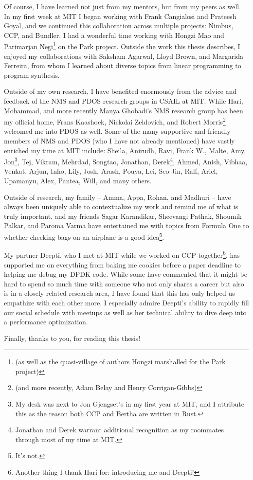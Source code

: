 Of course, I have learned not just from my mentors, but from my peers as well. In my first week at MIT I began working with Frank Cangialosi and Prateesh Goyal, and we continued this collaboration across multiple projects: Nimbus, CCP, and Bundler. I had a wonderful time working with Hongzi Mao and Parimarjan Negi\footnote{(as well as the quasi-village of authors Hongzi marshalled for the Park project)} on the Park project. 
Outside the work this thesis describes, I enjoyed my collaborations with Saksham Agarwal, Lloyd Brown, and Margarida Ferreira, from whom I learned about diverse topics from linear programming to program synthesis.

Outside of my own research, I have benefited enormously from the advice and feedback of the NMS and PDOS research groups in CSAIL at MIT. While Hari, Mohammad, and more recently Manya Ghobadi's NMS research group has been my official home, Frans Kaashoek, Nickolai Zeldovich, and Robert Morris\footnote{(and more recently, Adam Belay and Henry Corrigan-Gibbs)} welcomed me into PDOS as well. Some of the many supportive and friendly members of NMS and PDOS (who I have not already mentioned) have
vastly enriched my time at MIT include:
Sheila, Anirudh, Ravi, Frank W., Malte, Amy, Jon\footnote{My desk was next to Jon Gjengset's in my first year at MIT, and I attribute this as the reason both CCP and Bertha are written in Rust.}, Tej, Vikram, Mehrdad, Songtao, Jonathan, Derek\footnote{Jonathan and Derek warrant additional recognition as my roommates through most of my time at MIT.}, Ahmed, Anish, Vibhaa, Venkat, Arjun, Inho, Lily, Josh, Arash, Pouya, Lei, Seo Jin, Ralf, Ariel, Upamanyu, Alex, Pantea, Will, and many others.

Outside of research, my family -- Amma, Appa, Rohan, and Madhuri -- have always been uniquely able to contextualize my work and remind me of what is truly important, and my friends Sagar Karandikar, Sheevangi Pathak, Shoumik Palkar, and Paroma Varma have entertained me with topics from Formula One to whether checking bags on an airplane is a good idea\footnote{It's not.}.

My partner Deepti, who I met at MIT while we worked on CCP together\footnote{Another thing I thank Hari for: introducing me and Deepti!}, has supported me on everything from baking me cookies before a paper deadline to helping me debug my DPDK code. While some have commented that it might be hard to spend so much time with someone who not only shares a career but also is in a closely related research area, I have found that this has only helped us empathize with each other more.
I especially admire Deepti's ability to rapidly fill our social schedule with meetups as well as her technical ability to dive deep into a performance optimization.

Finally, thanks to you, for reading this thesis!

